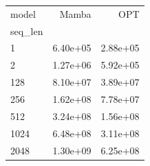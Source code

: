 \begin{tabular}{lrr}
\toprule
model & Mamba & OPT \\
seq_len &  &  \\
\midrule
1 & 6.40e+05 & 2.88e+05 \\
2 & 1.27e+06 & 5.92e+05 \\
128 & 8.10e+07 & 3.89e+07 \\
256 & 1.62e+08 & 7.78e+07 \\
512 & 3.24e+08 & 1.56e+08 \\
1024 & 6.48e+08 & 3.11e+08 \\
2048 & 1.30e+09 & 6.25e+08 \\
\bottomrule
\end{tabular}

